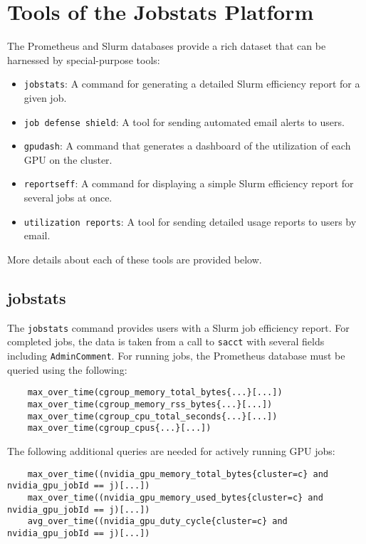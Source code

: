 \section{Tools of the Jobstats Platform}
\label{jobstats_tools}
The Prometheus and Slurm databases provide a rich dataset that can be harnessed by special-purpose tools:

\begin{itemize}
\item {\verb|jobstats|}: A command for generating a detailed Slurm efficiency report for a given job.
\item {\verb|job defense shield|}: A tool for sending automated email alerts to users.
\item {\verb|gpudash|}: A command that generates a dashboard of the utilization of each GPU on the cluster.
\item {\verb|reportseff|}: A command for displaying a simple Slurm efficiency report for several jobs at once.
\item {\verb|utilization reports|}: A tool for sending detailed usage reports to users by email.
\end{itemize}

\noindent
More details about each of these tools are provided below.

\subsection{jobstats}
The \texttt{jobstats} command provides users with a Slurm job efficiency report. For completed jobs, the data is taken from a call to \texttt{sacct} with several fields including \texttt{AdminComment}. For running jobs, the Prometheus database must be queried using the following:

\begin{verbatim}
    max_over_time(cgroup_memory_total_bytes{...}[...])
    max_over_time(cgroup_memory_rss_bytes{...}[...])
    max_over_time(cgroup_cpu_total_seconds{...}[...])
    max_over_time(cgroup_cpus{...}[...])
\end{verbatim}

\noindent
The following additional queries are needed for actively running GPU jobs:

\begin{verbatim}
    max_over_time((nvidia_gpu_memory_total_bytes{cluster=c} and nvidia_gpu_jobId == j)[...])
    max_over_time((nvidia_gpu_memory_used_bytes{cluster=c} and nvidia_gpu_jobId == j)[...])
    avg_over_time((nvidia_gpu_duty_cycle{cluster=c} and nvidia_gpu_jobId == j)[...])
\end{verbatim}

